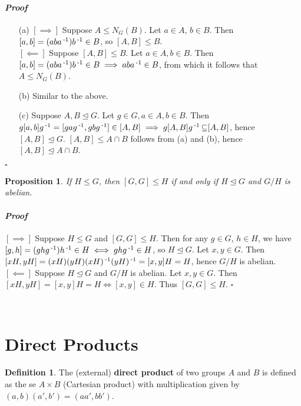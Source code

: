 \documentclass[11pt]{book}
\newcounter{counter}
\newtheorem{proposition}[counter]{Proposition}   \newtheorem{problem}[counter]{Problem}   \newtheorem*{proposition*}{Proposition}   \newtheorem*{lemma*}{Lemma}
\theoremstyle{definition}   \newtheorem{defn}[counter]{Definition} %
\newcommand{\nsg}{\mathrel{\unlhd}}   \newcommand{\ind}{\parindent24pt}   \newcommand{\vn}{\varnothing}
\newenvironment{prf}{\paragraph{\textit{Proof}}}{\hfill$\square$}
\newcommand{\vs}{\vspace{8pt}}
\numberwithin{counter}{chapter}
\begin{document}
\begin{prf}
	\begin{enumerate}
	\item[(a)] $[\implies]$ Suppose $A \leq N_G(B)$. Let $a\in A$, $b \in B$. Then $[a,b] = (aba\operatorname{^{-1}})b\operatorname{^{-1}} \in B$, so $[A,B] \leq B$. \\
	$[\impliedby]$ Suppose $[A,B] \leq B$. Let $a\in A, b \in B$. Then $[a,b] = (aba\operatorname{^{-1}})b\operatorname{^{-1}} \in B \implies aba\operatorname{^{-1}} \in B$, from which it follows that $A \leq N_G(B)$. \\

	\item[(b)] Similar to the above. \\

	\item[(c)] Suppose $A,B \nsg G$. Let $g \in G, a\in A, b\in B$. Then $g[a,b]g\operatorname{^{-1}} = [gag\operatorname{^{-1}},gbg\operatorname{^{-1}}] \in [A,B] \implies g[A,B]g\operatorname{^{-1}} \operatorname{\subseteq} [A,B]$, hence $[A,B] \nsg G$. $[A,B] \leq A\cap B$ follows from (a) and (b), hence $[A,B] \nsg A\cap B$.
	\end{enumerate}
\end{prf}

\vs

\begin{proposition}
If $H \leq G$, then $[G,G] \leq H$ if and only if $H \nsg G$ and $G/H$ is abelian.
\end{proposition}

\begin{prf}
$[\implies]$ Suppose $H \leq G$ and $[G,G] \leq H$. Then for any $g \in G$, $h \in H$, we have $[g,h] = (ghg\operatorname{^{-1}})h\operatorname{^{-1}} \in H \iff ghg\operatorname{^{-1}} \in H$, so $H \nsg G$. Let $x,y \in G$. Then $[xH,yH] = (xH)(yH)(xH)\operatorname{^{-1}}(yH)\operatorname{^{-1}} = [x,y]H = H$, hence $G/H$ is abelian. \\

$[\impliedby]$ Suppose $H \nsg G$ and $G/H$ is abelian. Let $x,y \in G$. Then $[xH,yH] = [x,y]H = H \iff [x,y] \in H$. Thus $[G,G] \leq H$.
\end{prf}

\ \\

\section*{Direct Products}

\vs

\begin{defn}
The (external) \textbf{direct product} of two groups $A$ and $B$ is defined as the se $A \times B$ (Cartesian product) with multiplication given by $(a,b)(a',b') = (aa',bb')$.
\end{defn}
\end{document}
